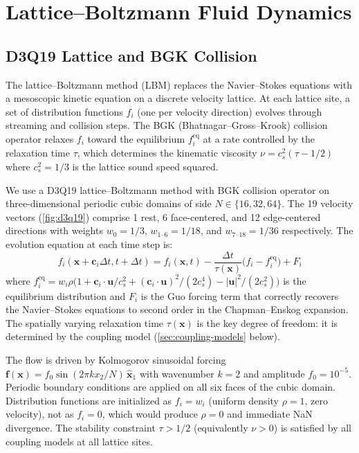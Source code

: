 \documentclass[12pt,openany]{report}
\theoremstyle{definition}
\theoremstyle{plain}
\theoremstyle{remark}
\begin{document}
\chapter{Lattice--Boltzmann Fluid Dynamics}
\label{ch:lbm}

\section{D3Q19 Lattice and BGK Collision}

The lattice--Boltzmann method (LBM) replaces the Navier--Stokes
equations with a mesoscopic kinetic equation on a discrete velocity
lattice.  At each lattice site, a set of distribution functions $f_i$
(one per velocity direction) evolves through streaming and collision
steps.  The BGK (Bhatnagar--Gross--Krook) collision operator relaxes
$f_i$ toward the equilibrium $f_i^{\mathrm{eq}}$ at a rate controlled
by the relaxation time $\tau$, which determines the kinematic viscosity
$\nu = c_s^2 (\tau - 1/2)$ where $c_s^2 = 1/3$ is the lattice sound
speed squared.

We use a D3Q19 lattice--Boltzmann method with BGK collision operator on
three-dimensional periodic cubic domains of side $N \in \{16, 32, 64\}$.
The 19 velocity vectors (\cref{fig:d3q19}) comprise 1 rest, 6
face-centered, and 12 edge-centered directions with weights
$w_0 = 1/3$, $w_{1\text{--}6} = 1/18$, and $w_{7\text{--}18} = 1/36$
respectively.  The evolution equation at each time step is:
\begin{equation}
  f_i(\mathbf{x} + \mathbf{c}_i \Delta t, t + \Delta t) =
    f_i(\mathbf{x}, t) -
    \frac{\Delta t}{\tau(\mathbf{x})}
    \bigl(f_i - f_i^{\mathrm{eq}}\bigr) + F_i
  \label{eq:bgk}
\end{equation}
where $f_i^{\mathrm{eq}} = w_i \rho \bigl(1 + \mathbf{c}_i \cdot
\mathbf{u}/c_s^2 + (\mathbf{c}_i \cdot \mathbf{u})^2/(2c_s^4) -
|\mathbf{u}|^2/(2c_s^2)\bigr)$ is the equilibrium distribution and
$F_i$ is the Guo forcing term that correctly recovers the
Navier--Stokes equations to second order in the Chapman--Enskog
expansion.  The spatially varying relaxation time $\tau(\mathbf{x})$
is the key degree of freedom: it is determined by the coupling model
(\cref{sec:coupling-models} below).

The flow is driven by Kolmogorov sinusoidal forcing
$\mathbf{f}(\mathbf{x}) = f_0 \sin(2\pi k x_2 / N) \, \hat{\mathbf{x}}_1$
with wavenumber $k = 2$ and amplitude $f_0 = 10^{-5}$.  Periodic
boundary conditions are applied on all six faces of the cubic domain.
Distribution functions are initialized as $f_i = w_i$ (uniform density
$\rho = 1$, zero velocity), not as $f_i = 0$, which would produce
$\rho = 0$ and immediate NaN divergence.  The stability constraint
$\tau > 1/2$ (equivalently $\nu > 0$) is satisfied by all coupling
models at all lattice sites.
\end{document}
